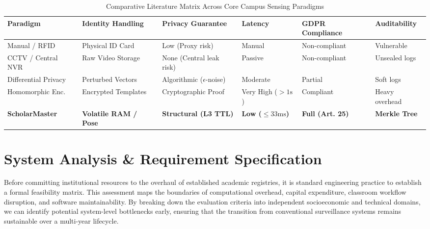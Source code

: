 \documentclass[12pt,a4paper,oneside]{report}
\begin{document}
\begin{table}[htbp]
\caption{Comparative Literature Matrix Across Core Campus Sensing Paradigms}
\label{tab:literature_comparison}
\centering
{}
\fontsize{9}{11}\selectfont
\begin{tabular}{@{}llllll@{}}
\toprule
\textbf{Paradigm} & \textbf{Identity Handling} & \textbf{Privacy Guarantee} & \textbf{Latency} & \textbf{GDPR Compliance} & \textbf{Auditability} \\
\midrule
Manual / RFID & Physical ID Card & Low (Proxy risk) & Manual & Non-compliant & Vulnerable \\
CCTV / Central NVR & Raw Video Storage & None (Central leak risk) & Passive & Non-compliant & Unsealed logs \\
Differential Privacy & Perturbed Vectors & Algorithmic ($\epsilon$-noise) & Moderate & Partial & Soft logs \\
Homomorphic Enc. & Encrypted Templates & Cryptographic Proof & Very High ($>1\text{s}$) & Compliant & Heavy overhead \\
\textbf{ScholarMaster} & \textbf{Volatile RAM / Pose} & \textbf{Structural (L3 TTL)} & \textbf{Low ($\le 33\text{ms}$)} & \textbf{Full (Art. 25)} & \textbf{Merkle Tree} \\
\bottomrule
\end{tabular}
\end{table}

\chapter{System Analysis \& Requirement Specification}
\thispagestyle{empty}

Before committing institutional resources to the overhaul of established academic registries, it is standard engineering practice to establish a formal feasibility matrix. This assessment maps the boundaries of computational overhead, capital expenditure, classroom workflow disruption, and software maintainability. By breaking down the evaluation criteria into independent socioeconomic and technical domains, we can identify potential system-level bottlenecks early, ensuring that the transition from conventional surveillance systems remains sustainable over a multi-year lifecycle.
\end{document}
